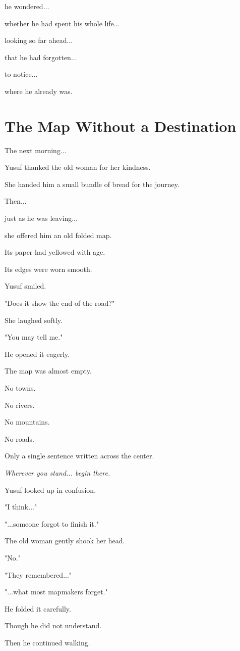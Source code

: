 \documentclass[12pt,openany]{book}
\begin{document}
he wondered...

whether he had spent his whole life...

looking so far ahead...

that he had forgotten...

to notice...

where he already was.

\section*{The Map Without a Destination}

The next morning...

Yusuf thanked the old woman for her kindness.

She handed him a small bundle of bread for the journey.

Then...

just as he was leaving...

she offered him an old folded map.

Its paper had yellowed with age.

Its edges were worn smooth.

Yusuf smiled.

"Does it show the end of the road?"

She laughed softly.

"You may tell me."

He opened it eagerly.

The map was almost empty.

No towns.

No rivers.

No mountains.

No roads.

Only a single sentence written across the center.

\emph{Wherever you stand... begin there.}

Yusuf looked up in confusion.

"I think..."

"...someone forgot to finish it."

The old woman gently shook her head.

"No."

"They remembered..."

"...what most mapmakers forget."

He folded it carefully.

Though he did not understand.

Then he continued walking.
\end{document}
